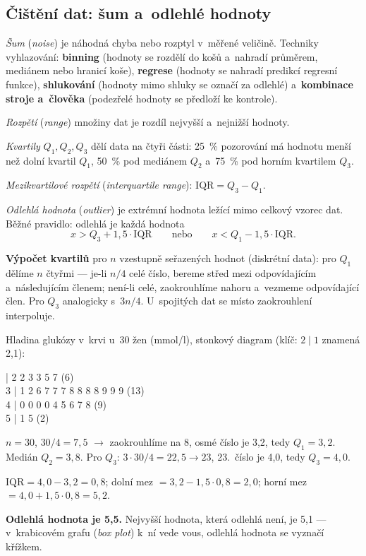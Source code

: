 \documentclass[11pt,a4paper]{article}
\theoremstyle{definition}
\begin{document}
\subsection{Čištění dat: šum a~odlehlé hodnoty}

\emph{Šum} (\emph{noise}) je náhodná chyba nebo rozptyl v~měřené veličině. Techniky
vyhlazování: \textbf{binning} (hodnoty se rozdělí do košů a~nahradí průměrem, mediánem nebo
hranicí koše), \textbf{regrese} (hodnoty se nahradí predikcí regresní funkce),
\textbf{shlukování} (hodnoty mimo shluky se označí za odlehlé) a~\textbf{kombinace stroje
a~člověka} (podezřelé hodnoty se předloží ke kontrole).

\begin{defbox}
\emph{Rozpětí} (\emph{range}) množiny dat je rozdíl nejvyšší a~nejnižší hodnoty.

\emph{Kvartily} $Q_1,Q_2,Q_3$ dělí data na čtyři části: 25~\% pozorování má hodnotu menší
než dolní kvartil $Q_1$, 50~\% pod mediánem $Q_2$ a~75~\% pod horním kvartilem $Q_3$.

\emph{Mezikvartilové rozpětí} (\emph{interquartile range}): $\mathrm{IQR}=Q_3-Q_1$.

\emph{Odlehlá hodnota} (\emph{outlier}) je extrémní hodnota ležící mimo celkový vzorec dat.
Běžné pravidlo: odlehlá je každá hodnota
\[ x > Q_3 + 1{,}5\cdot \mathrm{IQR} \qquad\text{nebo}\qquad x < Q_1 - 1{,}5\cdot \mathrm{IQR}. \]
\end{defbox}

\textbf{Výpočet kvartilů} pro $n$ vzestupně seřazených hodnot (diskrétní data): pro $Q_1$
dělíme $n$ čtyřmi --- je-li $n/4$ celé číslo, bereme střed mezi odpovídajícím a~následujícím
členem; není-li celé, zaokrouhlíme nahoru a~vezmeme odpovídající člen. Pro $Q_3$ analogicky
s~$3n/4$. U~spojitých dat se místo zaokrouhlení interpoluje.

\begin{defbox}
Hladina glukózy v~krvi u~30 žen (mmol/l), stonkový diagram (klíč: $2\mid 1$ znamená 2,1):
\begin{center} | 2 2 3 3 5 7 \hfill (6)\\
3 | 1 2 6 7 7 7 8 8 8 8 9 9 9 \hfill (13)\\
4 | 0 0 0 0 4 5 6 7 8 \hfill (9)\\
5 | 1 5 \hfill (2)
\end{center}
$n=30$, $30/4=7{,}5$ $\to$ zaokrouhlíme na 8, osmé číslo je 3,2, tedy $Q_1=3{,}2$. Medián
$Q_2=3{,}8$. Pro $Q_3$: $3\cdot 30/4=22{,}5\to 23$, 23.\ číslo je 4,0, tedy $Q_3=4{,}0$.

$\mathrm{IQR}=4{,}0-3{,}2=0{,}8$; dolní mez $=3{,}2-1{,}5\cdot 0{,}8=2{,}0$; horní mez
$=4{,}0+1{,}5\cdot 0{,}8=5{,}2$.

\textbf{Odlehlá hodnota je 5,5.} Nejvyšší hodnota, která odlehlá není, je 5,1 --- v~krabicovém
grafu (\emph{box plot}) k~ní vede vous, odlehlá hodnota se vyznačí křížkem.
\end{defbox}
\end{document}
